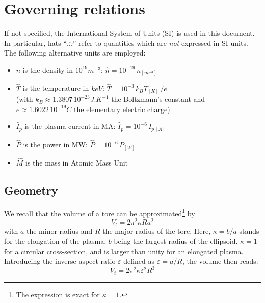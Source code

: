 
\section{Governing relations}
\label{sec:governing_eqs}

If not specified, the International System of Units (SI) is used in this document.
In particular, hats ``$\hat{...}$'' refer to quantities which are \emph{not} expressed in SI units. The following alternative units are employed: 
\begin{itemize}
    \item $\hat n$ is the density in $10^{19} \si{m^{-3}}$: 
    $\hat n = 10^{-19}\,n_{\si{[m^{-3}]}}$
    \item $\hat T$ is the temperature in $keV$: $\hat T = 10^{-3}\, k_B T_{[K]}\,/e$ \\(with $k_B \approx 1.3807\, 10^{-23} \si{J.K^{-1}}$ the Boltzmann's constant and $e\approx 1.6022\, 10^{-19}C$ the elementary electric charge)
    \item $\hat I_p$ is the plasma current in MA: $\hat I_p = 10^{-6}\,I_{p\,[A]}$
    \item $\hat P$ is the power in MW: $\hat P = 10^{-6}\, P_{[W]}$
    \item $\hat M$ is the mass in Atomic Mass Unit
\end{itemize}

\subsection{Geometry}

We recall that the volume of a tore can be approximated\footnote{The expression is exact for $\kappa=1$.} by 
\begin{equation}
V_t = 2\pi^2 \kappa R a^2
\end{equation}
with $a$ the minor radius and $R$ the major radius of the tore. Here, $\kappa=b/a$ stands for the elongation of the plasma, $b$ being the largest radius of the ellipsoid. $\kappa=1$ for a circular cross-section, and is larger than unity for an elongated plasma.
Introducing the inverse aspect ratio $\varepsilon$ defined as $\varepsilon  \doteq a /R$, the volume then reads:
\begin{equation}
\boxed{V_t = 2\pi^2 \kappa \varepsilon^2 R^3}
\label{eqn:tore_volume}
\end{equation}

